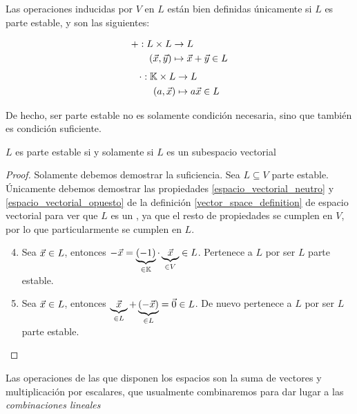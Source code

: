 \documentclass[../ecuaciones_diferenciales.tex]{subfiles}
\begin{document}
\begin{remark}
    Las operaciones inducidas por $V$ en $L$ están bien definidas únicamente si $L$ es parte estable, y son las siguientes:
    \begin{multicols}{2}
        \noindent
        \begin{align*} +: L \times L &\to L \\
                (\vec{x}, \vec{y}) &\mapsto \vec{x} + \vec{y} \in L
        \end{align*}
        \noindent
        \begin{align*}
            \cdot: \mathbb{K} \times L &\to L \\
                (a, \vec{x}) &\mapsto a \vec{x} \in L
        \end{align*}
    \end{multicols} 
\end{remark}

De hecho, ser parte estable no es solamente condición necesaria, sino que también es condición suficiente.

\begin{proposition}
    $L$ es parte estable si y solamente si $L$ es un subespacio vectorial
\end{proposition}

\begin{proof}
    Solamente debemos demostrar la suficiencia. Sea $L \subseteq V$ parte estable. Únicamente debemos demostrar las propiedades \ref{espacio_vectorial_neutro} y \ref{espacio_vectorial_opuesto} de la definición \ref{vector_space_definition} de espacio vectorial para ver que $L$ es un \kvspace, ya que el resto de propiedades se cumplen en $V$, por lo que particularmente se cumplen en $L$.
    
    \begin{enumerate}
        \setcounter{enumi}{3}
        \item Sea $\vec{x} \in L$, entonces $-\vec{x} = \underbrace{(-1)}_{\in \mathbb{K}} \cdot \underbrace{\vec{x}}_{\in V} \in L$. Pertenece a $L$ por ser $L$ parte estable.
        \setcounter{enumi}{2}
        \item Sea $\vec{x} \in L$, entonces $\underbrace{\vec{x}}_{\in L} + \underbrace{(-\vec{x})}_{\in L} = \vec{0} \in L$. De nuevo pertenece a $L$ por ser $L$ parte estable.
    \end{enumerate}
    $ $
\end{proof}

Las operaciones de las que disponen los espacios son la suma de vectores y multiplicación por escalares, que usualmente combinaremos para dar lugar a las \textit{combinaciones lineales}
\end{document}
